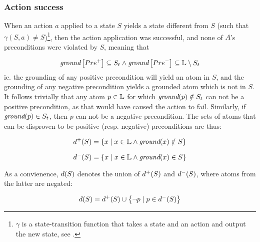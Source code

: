 \documentclass[\master/Master.tex]{subfiles}
\begin{document}
\subsubsection*{Action success}
When an action $a$ applied to a state $S$ yields a state different from $S$ (such that $\gamma (S, a) \neq S$)\footnote{$\gamma$ is a state-transition function that takes a state and an action and output the new state, see .}, then the action application was successful, and none of $A$'s preconditions were violated by $S$, meaning that

        \[ \textit{ground}\left[Pre^+\right] \subseteq S_t \land
            \textit{ground}\left[Pre^-\right] \subseteq \mathbb{L} \setminus S_t
        \]
ie. the grounding of any positive precondition will yield an atom in $S$, and the grounding of any negative precondition yields a grounded atom which is not in $S$.
It follows trivially that any atom $p \in \mathbb{L}$ for which $ \textit{ground}(p) \notin S_t$ can not be a positive precondition, as that would have caused the action to fail. Similarly, if $\textit{ground}(p) \in S_t$, then $p$ can not be a negative precondition. The sets of atoms that can be disproven to be positive (resp. negative) preconditions are thus:

\begin{equation*} \label{eq:DPlusTrans}
    d^+ (S) = \left\{ x \; | \; x \in \mathbb{L} \land \textit{ground}(x) \notin S \right\}
\end{equation*}

\begin{equation*} \label{eq:DMinusTrans}
    d^- (S) = \left\{ x \; | \; x \in \mathbb{L} \land \textit{ground}(x) \in S \right\}
\end{equation*}

As a convienence, $d(S)$ denotes the union of $d^+(S)$ and $d^-(S)$, where atoms from the latter are negated:

\begin{equation*}
    d(S) = d^+ (S) \cup \left\{ \neg p \; | \; p \in d^-(S) \right\}
\end{equation*}
\end{document}

